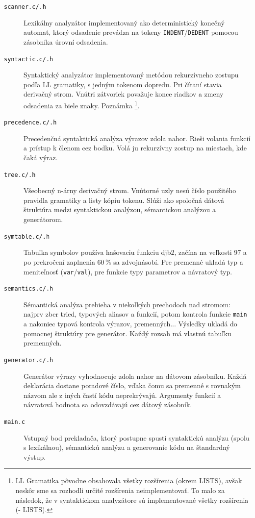 \documentclass[11pt,a4paper]{article}
\begin{document}
\begin{description}
    \item[\texttt{scanner.c/.h}] Lexikálny analyzátor implementovaný ako deterministický konečný automat, ktorý odsadenie prevádza na tokeny \texttt{INDENT}/\texttt{DEDENT} pomocou zásobníka úrovní odsadenia.

    \item[\texttt{syntactic.c/.h}] Syntaktický analyzátor implementovaný metódou rekurzívneho zostupu podľa LL gramatiky, s jedným tokenom dopredu. Pri čítaní stavia derivačný strom. Vnútri zátvoriek považuje konce riadkov a zmeny odsadenia za biele znaky. 
    Poznámka \footnote{LL Gramatika pôvodne obsahovala všetky rozšírenia (okrem LISTS), avšak neskôr sme sa rozhodli určité rozšírenia neimplementovať. To malo za následok, že v syntaktickom analyzátore sú implementované všetky rozšírenia (- LISTS).}.
    
    \item[\texttt{precedence.c/.h}] Precedenčná syntaktická analýza výrazov zdola nahor. Rieši volania funkcií a prístup k členom cez bodku. Volá ju rekurzívny zostup na miestach, kde čaká výraz.

    \item[\texttt{tree.c/.h}] Všeobecný n-árny derivačný strom. Vnútorné uzly nesú číslo použitého pravidla gramatiky a listy kópiu tokenu. Slúži ako spoločná dátová štruktúra medzi syntaktickou analýzou, sémantickou analýzou a generátorom.
    
    \item[\texttt{symtable.c/.h}] Tabuľka symbolov používa hašovaciu funkciu djb2, začína na veľkosti 97 a po prekročení zaplnenia 60\,\% sa zdvojnásobí. Pre premenné ukladá typ a meniteľnosť (\texttt{var}/\texttt{val}), pre funkcie typy parametrov a návratový typ.

    \item[\texttt{semantics.c/.h}] Sémantická analýza prebieha v niekoľkých prechodoch nad stromom: najprv zber tried, typových aliasov a funkcií, potom kontrola funkcie \texttt{main} a nakoniec typová kontrola výrazov, premenných... Výsledky ukladá do pomocnej štruktúry pre generátor. Každý rozsah má vlastnú tabuľku premenných. 

    \item[\texttt{generator.c/.h}] Generátor výrazy vyhodnocuje zdola nahor na dátovom zásobníku. Každá deklarácia dostane poradové číslo, vďaka čomu sa premenné s rovnakým názvom ale z iných častí kódu neprekrývajú. Argumenty funkcií a návratová hodnota sa odovzdávajú cez dátový zásobník.

    \item[\texttt{main.c}] Vstupný bod prekladača, ktorý postupne spustí syntaktickú analýzu (spolu s lexikálnou), sémantickú analýzu a generovanie kódu na štandardný výstup. 
\end{description}
\end{document}
